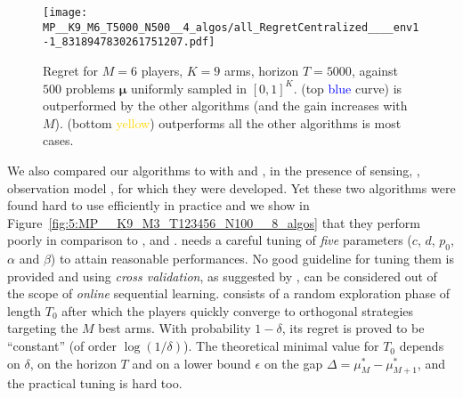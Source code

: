 %
%
\begin{figure}[!h]
    \texttt{[image: MP\_\_K9\_M6\_T5000\_N500\_\_4\_algos/all\_RegretCentralized\_\_\_\_env1-1\_8318947830261751207.pdf]}
  \caption[Regret for $M=6$ players, $K=9$ arms, horizon $T=5000$, against $500$ problems $\boldsymbol{\mu}$ uniformly sampled]{Regret for $M=6$ players, $K=9$ arms, horizon $T=5000$, against $500$ problems $\boldsymbol{\mu}$ uniformly sampled in $[0,1]^K$. \rhoRand{} (top \textcolor{blue}{blue} curve) is outperformed by the other algorithms (and the gain increases with $M$). \MCTopM{} (bottom \textcolor{gold}{yellow}) outperforms all the other algorithms is most cases.}
  \label{fig:5:MP__K9_M6_T5000_N500__4_algos__all_RegretCentralized__BayesianProblems}
\end{figure}



We also compared our algorithms to  %
with \MEGA{} \citep{Avner15} and \MusicalChair{} \citep{Rosenski16}, in the presence of sensing, \ie, observation model \modeldeux, for which they were developed.
Yet these two algorithms were found hard to use efficiently in practice and we show in
%
Figure~\ref{fig:5:MP__K9_M3_T123456_N100__8_algos} that they perform poorly in comparison to \rhoRand, \RandTopM{} and \MCTopM.
%
\MEGA{} needs a careful tuning of \emph{five} parameters ($c$, $d$, $p_0$, $\alpha$ and $\beta$) to attain reasonable performances. No good guideline for tuning them is provided and using \emph{cross validation}, as suggested by \cite{Avner15},
can be considered out of the scope of \emph{online} sequential learning.
%
\MusicalChair{} consists of a random exploration phase of length $T_0$ after which the players quickly converge to orthogonal strategies targeting the $M$ best arms. With probability $1-\delta$, its regret is proved to be ``constant'' (of order $\log(1/\delta)$). The theoretical minimal value for $T_0$ depends on $\delta$, on the horizon $T$ and on a lower bound $\epsilon$ on the gap $\Delta = \mu^*_M - \mu^*_{M+1}$, and the practical tuning is hard too. %



